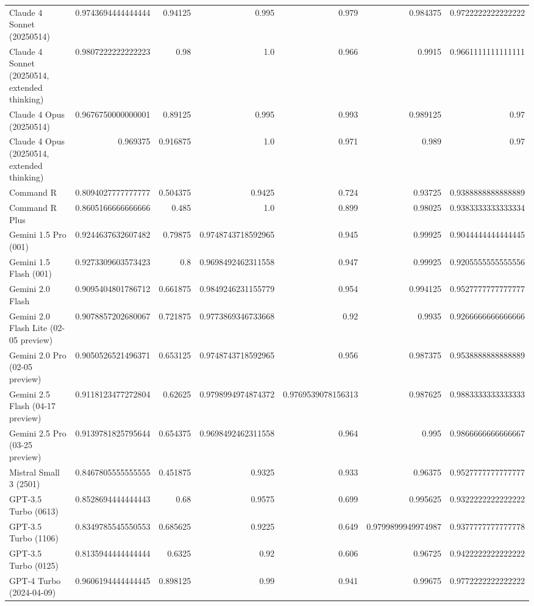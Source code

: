 \begin{table}[htp]
{\begin{tabular}{lrrrrrr}
Claude 4 Sonnet (20250514) & 0.9743694444444444 & 0.94125 & 0.995 & 0.979 & 0.984375 & 0.9722222222222222 \\
Claude 4 Sonnet (20250514, extended thinking) & 0.9807222222222223 & 0.98 & 1.0 & 0.966 & 0.9915 & 0.9661111111111111 \\
Claude 4 Opus (20250514) & 0.9676750000000001 & 0.89125 & 0.995 & 0.993 & 0.989125 & 0.97 \\
Claude 4 Opus (20250514, extended thinking) & 0.969375 & 0.916875 & 1.0 & 0.971 & 0.989 & 0.97 \\
Command R & 0.8094027777777777 & 0.504375 & 0.9425 & 0.724 & 0.93725 & 0.9388888888888889 \\
Command R Plus & 0.8605166666666666 & 0.485 & 1.0 & 0.899 & 0.98025 & 0.9383333333333334 \\
Gemini 1.5 Pro (001) & 0.9244637632607482 & 0.79875 & 0.9748743718592965 & 0.945 & 0.99925 & 0.9044444444444445 \\
Gemini 1.5 Flash (001) & 0.9273309603573423 & 0.8 & 0.9698492462311558 & 0.947 & 0.99925 & 0.9205555555555556 \\
Gemini 2.0 Flash & 0.9095404801786712 & 0.661875 & 0.9849246231155779 & 0.954 & 0.994125 & 0.9527777777777777 \\
Gemini 2.0 Flash Lite (02-05 preview) & 0.9078857202680067 & 0.721875 & 0.9773869346733668 & 0.92 & 0.9935 & 0.9266666666666666 \\
Gemini 2.0 Pro (02-05 preview) & 0.9050526521496371 & 0.653125 & 0.9748743718592965 & 0.956 & 0.987375 & 0.9538888888888889 \\
Gemini 2.5 Flash (04-17 preview) & 0.9118123477272804 & 0.62625 & 0.9798994974874372 & 0.9769539078156313 & 0.987625 & 0.9883333333333333 \\
Gemini 2.5 Pro (03-25 preview) & 0.9139781825795644 & 0.654375 & 0.9698492462311558 & 0.964 & 0.995 & 0.9866666666666667 \\
Mistral Small 3 (2501) & 0.8467805555555555 & 0.451875 & 0.9325 & 0.933 & 0.96375 & 0.9527777777777777 \\
GPT-3.5 Turbo (0613) & 0.8528694444444443 & 0.68 & 0.9575 & 0.699 & 0.995625 & 0.9322222222222222 \\
GPT-3.5 Turbo (1106) & 0.8349785545550553 & 0.685625 & 0.9225 & 0.649 & 0.9799899949974987 & 0.9377777777777778 \\
GPT-3.5 Turbo (0125) & 0.8135944444444444 & 0.6325 & 0.92 & 0.606 & 0.96725 & 0.9422222222222222 \\
GPT-4 Turbo (2024-04-09) & 0.9606194444444445 & 0.898125 & 0.99 & 0.941 & 0.99675 & 0.9772222222222222 \\

\end{tabular}}
\end{table}
